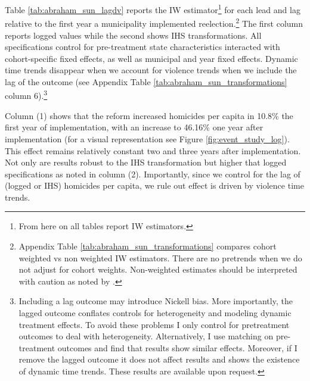 \documentclass[12pt]{amsart}
\makeatletter
\def\subsection{\@startsection{subsection}{2}
	\z@{.8\linespacing\@plus.7\linespacing}{.7\linespacing}{\large}}
\numberwithin{equation}{section}
\theoremstyle{definition}
\theoremstyle{definition}
\theoremstyle{definition}
\makeatother
\begin{document}
  

Table \ref{tab:abraham_sun_lagdv} reports the IW estimator\footnote{From here on all tables report IW estimators.} for each lead and lag relative to the first year a municipality implemented reelection.\footnote{Appendix Table \ref{tab:abraham_sun_transformations} compares cohort weighted vs non weighted IW estimators. There are no pretrends when we do not adjust for cohort weights. Non-weighted estimates should be interpreted with caution as noted by \citet{abraham_sun_2020}.} The first column reports logged values while the second shows IHS transformations. All specifications control for pre-treatment state characteristics  interacted with cohort-specific fixed effects, as well as municipal and year fixed effects. Dynamic time trends disappear when we account for violence trends when we include the lag of the outcome (see Appendix Table \ref{tab:abraham_sun_transformations} column 6).\footnote{Including a lag outcome may introduce Nickell bias. More importantly, the lagged outcome conflates controls for heterogeneity and modeling dynamic treatment effects. To avoid these problems I only control for pretreatment outcomes to deal with heterogeneity. Alternatively, I use matching on pre-treatment outcomes and find that results show similar effects. Moreover, if I remove the lagged outcome it does not affect results and shows the existence of dynamic time trends. These results are available upon request.}  

Column (1) shows that the reform increased homicides per capita in 10.8\% the first year of implementation, with an increase to 46.16\% one year after implementation (for a visual representation see Figure \ref{fig:event_study_log}). This effect remains relatively constant two and three years after implementation. Not only are results robust to the IHS transformation but higher that logged specifications as noted in column (2). Importantly, since we control for the lag of (logged or IHS) homicides per capita, we rule out effect is driven by violence time trends.  


\subsection{Identification \label{sec:identification}}
 
\end{document}
